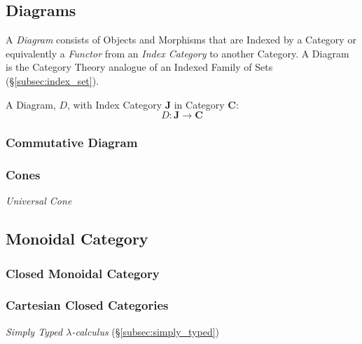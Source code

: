 \subsection{Diagrams}\label{subsec:category_diagram}

A \emph{Diagram} consists of Objects and Morphisms that are Indexed by
a Category or equivalently a \emph{Functor} from an \emph{Index
  Category} to another Category. A Diagram is the Category Theory
analogue of an Indexed Family of Sets (\S\ref{subsec:index_set}).

A Diagram, $D$, with Index Category $\mathbf{J}$ in Category
$\mathbf{C}$:
\[
    D : \mathbf{J} \rightarrow \mathbf{C}
\]



\subsubsection{Commutative Diagram}\label{subsec:commutative_diagram}



\subsubsection{Cones}\label{subsec:category_cone}

\emph{Universal Cone}




\subsection{Monoidal Category}\label{subsec:monoidal_category}

\subsubsection{Closed Monoidal Category}\label{subsec:closed_monoidal}

\subsubsection{Cartesian Closed Categories}\label{subsec:cartesian_category}

\emph{Simply Typed $\lambda$-calculus} (\S\ref{subsec:simply_typed})



